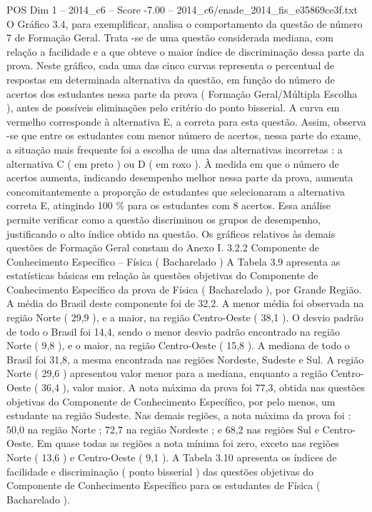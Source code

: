 \begin{textsample}{POS Dim 1 – 2014\_c6 – Score -7.00 – 2014\_c6/enade\_2014\_fis\_e35869ce3f.txt}
O Gráfico 3.4, para exemplificar, analisa o comportamento da questão de número 7 de Formação Geral.
Trata -se de uma questão considerada mediana, com relação a facilidade e a que obteve o maior índice de discriminação dessa parte da prova.
Neste gráfico, cada uma das cinco curvas representa o percentual de respostas em determinada alternativa da questão, em função do número de acertos dos estudantes nessa parte da prova ( Formação Geral/Múltipla Escolha ), antes de possíveis eliminações pelo critério do ponto bisserial.
A curva em vermelho corresponde à alternativa E, a correta para esta questão.
Assim, observa -se que entre os estudantes com menor número de acertos, nessa parte do exame, a situação mais frequente foi a escolha de uma das alternativas incorretas : a alternativa C ( em preto ) ou D ( em roxo ).
À medida em que o número de acertos aumenta, indicando desempenho melhor nessa parte da prova, aumenta concomitantemente a proporção de estudantes que selecionaram a alternativa correta E, atingindo 100 \% para os estudantes com 8 acertos.
Essa análise permite verificar como a questão discriminou os grupos de desempenho, justificando o alto índice obtido na questão.
Os gráficos relativos às demais questões de Formação Geral constam do Anexo I. 3.2.2 Componente de Conhecimento Específico – Física ( Bacharelado ) A Tabela 3.9 apresenta as estatísticas básicas em relação às questões objetivas do Componente de Conhecimento Específico da prova de Física ( Bacharelado ), por Grande Região.
A média do Brasil deste componente foi de 32,2.
A menor média foi observada na região Norte ( 29,9 ), e a maior, na região Centro-Oeste ( 38,1 ).
O desvio padrão de todo o Brasil foi 14,4, sendo o menor desvio padrão encontrado na região Norte ( 9,8 ), e o maior, na região Centro-Oeste ( 15,8 ).
A mediana de todo o Brasil foi 31,8, a mesma encontrada nas regiões Nordeste, Sudeste e Sul.
A região Norte ( 29,6 ) apresentou valor menor para a mediana, enquanto a região Centro-Oeste ( 36,4 ), valor maior.
A nota máxima da prova foi 77,3, obtida nas questões objetivas do Componente de Conhecimento Específico, por pelo menos, um estudante na região Sudeste.
Nas demais regiões, a nota máxima da prova foi : 50,0 na região Norte ; 72,7 na região Nordeste ; e 68,2 nas regiões Sul e Centro-Oeste.
Em quase todas as regiões a nota mínima foi zero, exceto nas regiões Norte ( 13,6 ) e Centro-Oeste ( 9,1 ).
A Tabela 3.10 apresenta os índices de facilidade e discriminação ( ponto bisserial ) das questões objetivas do Componente de Conhecimento Específico para os estudantes de Física ( Bacharelado ).

\end{textsample}
